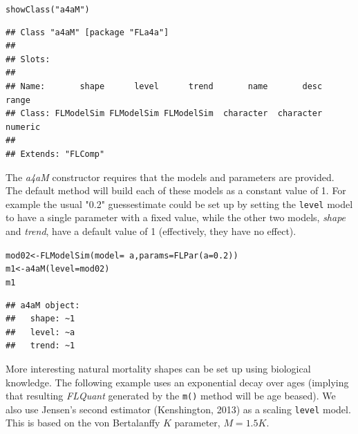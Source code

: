 \documentclass[a4paper,english,10pt]{article}\usepackage[]{graphicx}\usepackage[]{color}
\makeatletter
\newcommand{\hlnum}[1]{\textcolor[rgb]{0.2,0.2,0.2}{#1}}%
\newcommand{\hlstr}[1]{\textcolor[rgb]{0.2,0.2,0.2}{#1}}%
\newcommand{\hlopt}[1]{\textcolor[rgb]{0.2,0.2,0.2}{#1}}%
\newcommand{\hlstd}[1]{\textcolor[rgb]{0,0,0}{#1}}%
\newcommand{\hlkwb}[1]{\textcolor[rgb]{0.361,0.506,0.596}{#1}}%
\newcommand{\hlkwc}[1]{\textcolor[rgb]{0.361,0.506,0.596}{#1}}%
\newcommand{\hlkwd}[1]{\textcolor[rgb]{0.361,0.506,0.596}{#1}}%
\newenvironment{kframe}{%
 \def\at@end@of@kframe{}%
 \ifinner\ifhmode%
  \def\at@end@of@kframe{\end{minipage}}%
  \begin{minipage}{\columnwidth}%
 \fi\fi%
 \def\FrameCommand##1{\hskip\@totalleftmargin \hskip-\fboxsep
 \colorbox{shadecolor}{##1}\hskip-\fboxsep
     \hskip-\linewidth \hskip-\@totalleftmargin \hskip\columnwidth}%
 \MakeFramed {\advance\hsize-\width
   \@totalleftmargin\z@ \linewidth\hsize
   \@setminipage}}%
 {\par\unskip\endMakeFramed%
 \at@end@of@kframe}
\newenvironment{knitrout}{}{} %
\newcommand{\code}[1]{{\texttt{#1}}}
\newcommand{\class}[1]{{\textit{#1}}}
\makeatother
\begin{document}
\begin{knitrout}
\color{fgcolor}\begin{kframe}
\begin{alltt}
\hlkwd{showClass}\hlstd{(}\hlstr{"a4aM"}\hlstd{)}
\end{alltt}
\begin{verbatim}
## Class "a4aM" [package "FLa4a"]
## 
## Slots:
##                                                                         
## Name:       shape      level      trend       name       desc      range
## Class: FLModelSim FLModelSim FLModelSim  character  character    numeric
## 
## Extends: "FLComp"
\end{verbatim}
\end{kframe}
\end{knitrout}


The \class{a4aM} constructor requires that the models and parameters are provided. The default method will build each of these models as a constant value of 1. For example the usual "0.2" guessestimate could be set up by setting the \code{level} model to have a single parameter with a fixed value, while the other two models, \class{shape} and \class{trend}, have a default value of 1 (effectively, they have no effect).

\begin{knitrout}
\color{fgcolor}\begin{kframe}
\begin{alltt}
\hlstd{mod02} \hlkwb{<-} \hlkwd{FLModelSim}\hlstd{(}\hlkwc{model} \hlstd{=} \hlopt{~}\hlstd{a,} \hlkwc{params} \hlstd{=} \hlkwd{FLPar}\hlstd{(}\hlkwc{a} \hlstd{=} \hlnum{0.2}\hlstd{))}
\hlstd{m1} \hlkwb{<-} \hlkwd{a4aM}\hlstd{(}\hlkwc{level} \hlstd{= mod02)}
\hlstd{m1}
\end{alltt}
\begin{verbatim}
## a4aM object:
##   shape: ~1
##   level: ~a
##   trend: ~1
\end{verbatim}
\end{kframe}
\end{knitrout}


More interesting natural mortality shapes can be set up using biological knowledge. The following example uses an exponential decay over ages (implying that resulting \class{FLQuant} generated by the \code{m()} method will be age beased). We also use Jensen's second estimator (Kenshington, 2013) as a scaling \code{level} model. This is based on the von Bertalanffy $K$ parameter, $M=1.5K$. 
\end{document}

